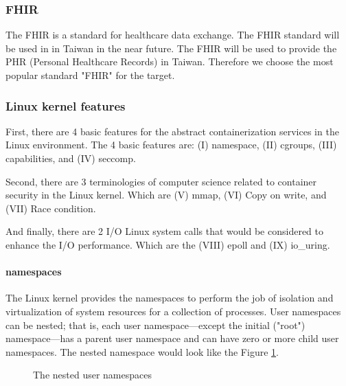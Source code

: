 \documentclass[12pt,a4paper]{IEEEconf}
\begin{document}
\subsubsection{FHIR}
The FHIR is a standard for healthcare data exchange. The FHIR standard will be used in
in Taiwan in the near future\cite{MOHW_FHIR}. The FHIR will be used to provide the PHR
(Personal Healthcare Records) in Taiwan. Therefore we choose the most popular standard
"FHIR" for the target.

\subsubsection{Linux kernel features}
First, there are 4 basic features for the abstract containerization services in the Linux
environment.
The 4 basic features are: (\RN{1}) namespace, (\RN{2}) cgroups, (\RN{3}) capabilities,
and (\RN{4}) seccomp.

Second, there are 3 terminologies of computer science related to container security in
the Linux kernel. Which are (\RN{5}) mmap, (\RN{6}) Copy on write, and (\RN{7}) Race condition.

And finally, there are 2 I/O Linux system calls that would be considered to enhance the I/O performance.
Which are the (\RN{8}) epoll and (\RN{9}) io\_uring.

\paragraph{namespaces}
The Linux kernel provides the namespaces to perform the job of isolation and virtualization
of system resources for a collection of processes\cite{Road_Ahead}.
User namespaces can be nested; that is, each user namespace—except the initial ("root")
namespace—has a parent user namespace and can have zero or more child user namespaces.
\cite{user_namespaces}
The nested namespace would look like the Figure \ref*{Nested}.
\begin{figure}
  \centering
  \caption[]{The nested user namespaces}
  \label{Nested}
\end{figure}
\end{document}

